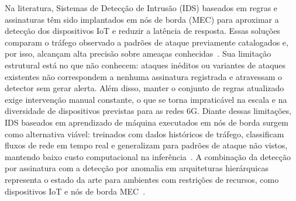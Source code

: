\documentclass[12pt,a4paper]{article}
\begin{document}
Na literatura, Sistemas de Detecção de Intrusão (IDS) baseados em regras e
assinaturas têm sido implantados em nós de borda (MEC) para aproximar a
detecção dos dispositivos IoT e reduzir a latência de resposta. Essas soluções
comparam o tráfego observado a padrões de ataque previamente catalogados e,
por isso, alcançam alta precisão sobre ameaças conhecidas~\cite{lazarevic:05}.
Sua limitação estrutural está no que não conhecem: ataques inéditos ou
variantes de ataques existentes não correspondem a nenhuma assinatura
registrada e atravessam o detector sem gerar alerta. Além disso, manter o
conjunto de regras atualizado exige intervenção manual constante, o que se
torna impraticável na escala e na diversidade de dispositivos previstas para
as redes 6G. Diante dessas limitações, IDS baseados em aprendizado de máquina
executados em nós de borda surgem como alternativa viável: treinados com dados
históricos de tráfego, classificam fluxos de rede em tempo real e generalizam
para padrões de ataque não vistos, mantendo baixo custo computacional na
inferência~\cite{gyamfi:22}. A combinação da detecção por assinatura com a
detecção por anomalia em arquiteturas hierárquicas representa o estado da arte
para ambientes com restrições de recursos, como dispositivos IoT e nós de
borda MEC~\cite{zolanvari:19}.
\end{document}
